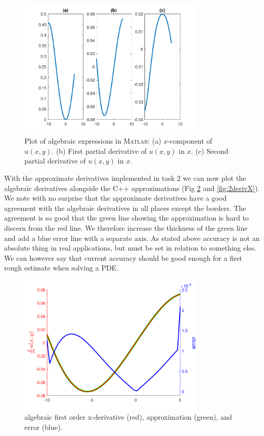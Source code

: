 \documentclass[paper=a4, fontsize=12pt]{article} %
\begin{document}
\begin{figure}[H]
  \centering
  \includegraphics[width=0.8\textwidth]{algebraicDeriv.pdf}
  \caption{\small Plot of algebraic expressions in \textsc{Matlab}: (a) $x$-component of $u(x,y)$. (b) First partial derivative of $u(x,y)$ in $x$. (c) Second partial derivative of $u(x,y)$ in $x$.\label{fig:algebraic}}
\end{figure}

With the approximate derivatives implemented in task 2 we can now plot the algebraic derivatives alongside the C++ approximations (Fig \ref{fig:1derivX} and \ref{fig:2derivX}).
We note with no surprise that the approximate derivatives have a good agreement with the algebraic derivatives in all places except the borders. The agreement is so good that the green line showing the approximation is hard to discern from the red line. We therefore increase the thickness of the green line and add a blue error line with a separate axis. As stated above accuracy is not an absolute thing in real applications, but must be set in relation to something else. We can however say that current accuracy should be good enough for a first rough estimate when solving a PDE.


\begin{figure}[H]
  \centering
  \includegraphics[width=0.8\textwidth]{comparison-x.pdf}
  \caption{\small algebraic first order x-derivative (red), approximation (green), and error (blue).\label{fig:1derivX}}
\end{figure}
\end{document}
